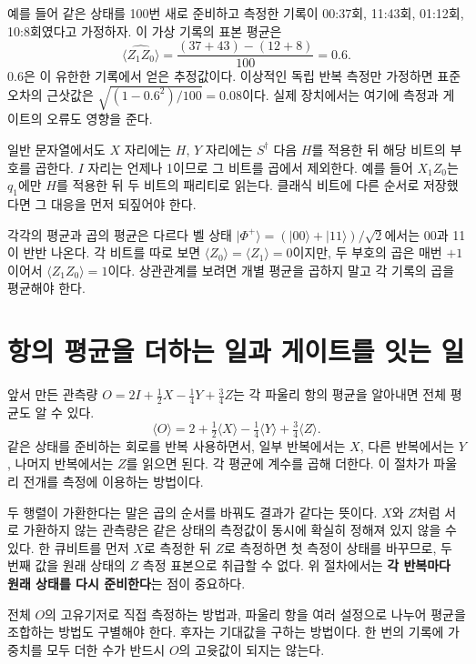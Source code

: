 예를 들어 같은 상태를 100번 새로 준비하고 측정한 기록이
00:37회, 11:43회, 01:12회, 10:8회였다고 가정하자.
이 가상 기록의 표본 평균은
\[
\widehat{\langle Z_1Z_0\rangle}
=\frac{(37+43)-(12+8)}{100}=0.6.
\]
0.6은 이 유한한 기록에서 얻은 추정값이다.
이상적인 독립 반복 측정만 가정하면 표준오차의 근삿값은
\(\sqrt{(1-0.6^2)/100}=0.08\)이다. 실제 장치에서는 여기에 측정과 게이트의 오류도 영향을 준다.

일반 문자열에서도 \(X\) 자리에는 \(H\), \(Y\) 자리에는
\(S^\dagger\) 다음 \(H\)를 적용한 뒤 해당 비트의 부호를 곱한다.
\(I\) 자리는 언제나 1이므로 그 비트를 곱에서 제외한다.
예를 들어 \(X_1Z_0\)는 \(q_1\)에만 \(H\)를 적용한 뒤 두 비트의 패리티로 읽는다.
클래식 비트에 다른 순서로 저장했다면 그 대응을 먼저 되짚어야 한다.

\begin{examplebox}{각각의 평균과 곱의 평균은 다르다}
벨 상태 \(\lvert\Phi^+\rangle=(\lvert00\rangle+\lvert11\rangle)/\sqrt2\)에서는
00과 11이 반반 나온다. 각 비트를 따로 보면
\(\langle Z_0\rangle=\langle Z_1\rangle=0\)이지만,
두 부호의 곱은 매번 \(+1\)이어서 \(\langle Z_1Z_0\rangle=1\)이다.
상관관계를 보려면 개별 평균을 곱하지 말고 각 기록의 곱을 평균해야 한다.
\end{examplebox}

\section{항의 평균을 더하는 일과 게이트를 잇는 일}

앞서 만든 관측량 \(O=2I+\tfrac12X-\tfrac14Y+\tfrac34Z\)는
각 파울리 항의 평균을 알아내면 전체 평균도 알 수 있다.
\[
\langle O\rangle=2+\tfrac12\langle X\rangle
-\tfrac14\langle Y\rangle+\tfrac34\langle Z\rangle.
\]
같은 상태를 준비하는 회로를 반복 사용하면서, 일부 반복에서는 \(X\), 다른 반복에서는
\(Y\), 나머지 반복에서는 \(Z\)를 읽으면 된다.
각 평균에 계수를 곱해 더한다. 이 절차가 파울리 전개를 측정에 이용하는 방법이다.

두 행렬이 가환한다는 말은 곱의 순서를 바꿔도 결과가 같다는 뜻이다.
\(X\)와 \(Z\)처럼 서로 가환하지 않는 관측량은 같은 상태의 측정값이
동시에 확실히 정해져 있지 않을 수 있다.
한 큐비트를 먼저 \(X\)로 측정한 뒤 \(Z\)로 측정하면 첫 측정이 상태를 바꾸므로,
두 번째 값을 원래 상태의 \(Z\) 측정 표본으로 취급할 수 없다.
위 절차에서는 \textbf{각 반복마다 원래 상태를 다시 준비한다}는 점이 중요하다.

전체 \(O\)의 고유기저로 직접 측정하는 방법과, 파울리 항을 여러 설정으로 나누어
평균을 조합하는 방법도 구별해야 한다. 후자는 기대값을 구하는 방법이다.
한 번의 기록에 가중치를 모두 더한 수가 반드시 \(O\)의 고윳값이 되지는 않는다.

